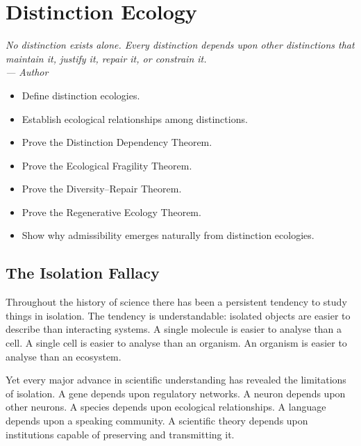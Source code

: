 \documentclass[12pt,twoside,openright]{book}
\newenvironment{epigraph}[2]{%
  \vspace{1em}\begin{flushright}
  \begin{minipage}{0.72\textwidth}
  \itshape\small #1\\[0.4em]
  \upshape\footnotesize\sffamily\color{DistGray}--- #2
  \end{minipage}\end{flushright}\vspace{1.5em}}{}
\newenvironment{objectives}{%
  \begin{tcolorbox}[colback=DistBlue!5,colframe=DistBlue,
    title={\faCheckCircle\enspace Learning Objectives},
    fonttitle=\sffamily\bfseries\color{white},
    attach boxed title to top left={yshift=-2mm,xshift=4mm},
    boxed title style={colback=DistBlue},breakable]
  \begin{itemize}[leftmargin=*,nosep]}{%
  \end{itemize}\end{tcolorbox}\vspace{1em}}
\begin{document}
\chapter{Distinction Ecology}
\label{ch:distinction-ecology}

\begin{epigraph}{No distinction exists alone. Every
  distinction depends upon other distinctions that maintain
  it, justify it, repair it, or constrain it.}%
  {Author}
\end{epigraph}

\begin{objectives}
  \item Define distinction ecologies.
  \item Establish ecological relationships among
        distinctions.
  \item Prove the Distinction Dependency Theorem.
  \item Prove the Ecological Fragility Theorem.
  \item Prove the Diversity--Repair Theorem.
  \item Prove the Regenerative Ecology Theorem.
  \item Show why admissibility emerges naturally from
        distinction ecologies.
\end{objectives}

\section{The Isolation Fallacy}
\label{sec:ch12-isolation}

Throughout the history of science there has been a
persistent tendency to study things in isolation. The
tendency is understandable: isolated objects are easier to
describe than interacting systems. A single molecule is
easier to analyse than a cell. A single cell is easier to
analyse than an organism. An organism is easier to analyse
than an ecosystem.

Yet every major advance in scientific understanding has
revealed the limitations of isolation. A gene depends upon
regulatory networks. A neuron depends upon other neurons. A
species depends upon ecological relationships. A language
depends upon a speaking community. A scientific theory
depends upon institutions capable of preserving and
transmitting it.
\end{document}
